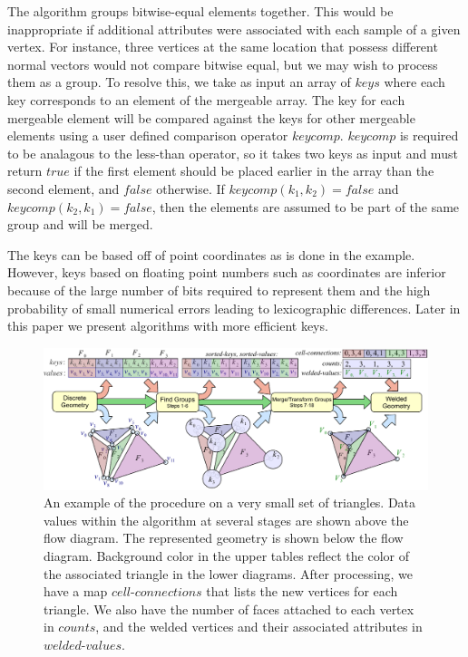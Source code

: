 \documentclass[10pt,journal,cspaper,compsoc]{IEEEtran}
\begin{document}
The  algorithm groups bitwise-equal elements together. 
This would be inappropriate if additional attributes were associated with
each sample of a given vertex. For instance, three vertices at the same location that possess different normal vectors
would not compare bitwise equal, but we may wish to process them as a group. To resolve this, we take as input an array of $keys$ where
each key corresponds to an element of the mergeable array. The key for each mergeable element will be compared against the keys for
other mergeable elements using a user defined comparison operator $keycomp$. $keycomp$ is required to be analagous to the less-than operator, so
it takes two keys as input and must return $true$ if the first element should be placed earlier in the array than the second element, and $false$
otherwise. If $keycomp(k_1, k_2) = false$ and $keycomp(k_2, k_1) = false$, then the elements are assumed to be part of the same group and will be merged.

The keys can be based off of point coordinates as is done in the  example. However, keys based on floating point numbers such as coordinates are inferior because of the large number of bits required to represent them and the high probability of small numerical errors leading to lexicographic differences. Later in this paper we present algorithms with more efficient keys.

\begin{figure}[!tb]
\includegraphics[width=\textwidth]{KeyWeld.pdf}
\caption{An example of the  procedure on a very small set of triangles. Data values within the algorithm at several stages are shown above the flow diagram. The represented geometry is shown below the flow diagram. Background color in the upper tables reflect the color of the associated triangle in the lower diagrams. After processing, we have a map $cell\mbox{-}connections$ that lists the new vertices for each triangle. We also have the
number of faces attached to each vertex in $counts$, and the welded vertices and their associated attributes in $welded\mbox{-}values.$}
\label{fig:KeyWeld}
\end{figure}
\end{document}
